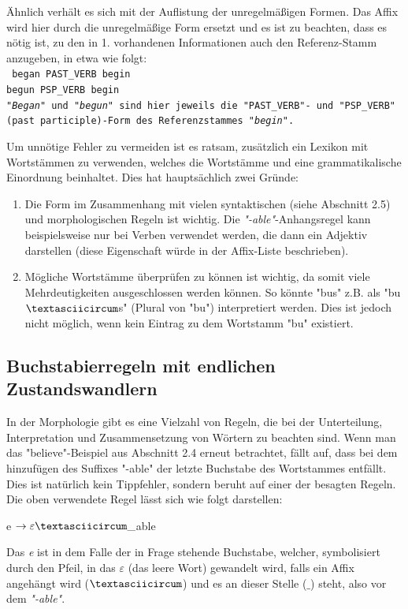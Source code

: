 \documentclass[12pt]{report}
\begin{document}
Ähnlich verhält es sich mit der Auflistung der unregelmäßigen Formen. Das Affix wird hier durch die unregelmäßige Form ersetzt und es ist zu beachten, dass es nötig ist, zu den in 1. vorhandenen Informationen auch den Referenz-Stamm anzugeben, in etwa wie folgt:
\\
\tt
began PAST\_VERB begin\\
begun PSP\_VERB begin\\
\rm
\textit{"Began"} und \textit{"begun"} sind hier jeweils die "PAST\_VERB"- und "PSP\_VERB" (past participle)-Form des Referenzstammes \textit{"begin"}.

Um unnötige Fehler zu vermeiden ist es ratsam, zusätzlich ein Lexikon mit Wortstämmen zu verwenden, welches die Wortstämme und eine grammatikalische Einordnung beinhaltet. Dies hat hauptsächlich zwei Gründe: 

\begin{enumerate}
\item Die Form im Zusammenhang mit vielen syntaktischen (siehe Abschnitt 2.5) und morphologischen Regeln ist wichtig. Die \textit{"-able"}-Anhangsregel kann beispielsweise nur bei Verben verwendet werden, die dann ein Adjektiv darstellen (diese Eigenschaft würde in der Affix-Liste beschrieben).
\item Mögliche Wortstämme überprüfen zu können ist wichtig, da somit viele Mehrdeutigkeiten ausgeschlossen werden können. So könnte "bus" z.B. als "bu$\textasciicircum$s" (Plural von "bu") interpretiert werden. Dies ist jedoch nicht möglich, wenn kein Eintrag zu dem Wortstamm "bu" existiert. 
\end{enumerate}

\subsection{Buchstabierregeln mit endlichen Zustandswandlern}
In der Morphologie gibt es eine Vielzahl von Regeln, die bei der Unterteilung, Interpretation und Zusammensetzung von Wörtern zu beachten sind. Wenn man das "believe"-Beispiel aus Abschnitt 2.4 erneut betrachtet, fällt auf, dass bei dem hinzufügen des Suffixes "-able" der letzte Buchstabe des Wortstammes entfällt. Dies ist natürlich kein Tippfehler, sondern beruht auf einer der besagten Regeln. Die oben verwendete Regel lässt sich wie folgt darstellen:
\tt
\begin{center}
e $\rightarrow \varepsilon \textasciicircum \_$able
\end{center}
\rm
Das \textit{e} ist in dem Falle der in Frage stehende Buchstabe, welcher, symbolisiert durch den Pfeil, in das $\varepsilon$ (das leere Wort) gewandelt wird, falls ein Affix angehängt wird ($\textasciicircum$) und es an dieser Stelle ($\_$) steht, also vor dem \textit{"-able"}.
\end{document}
